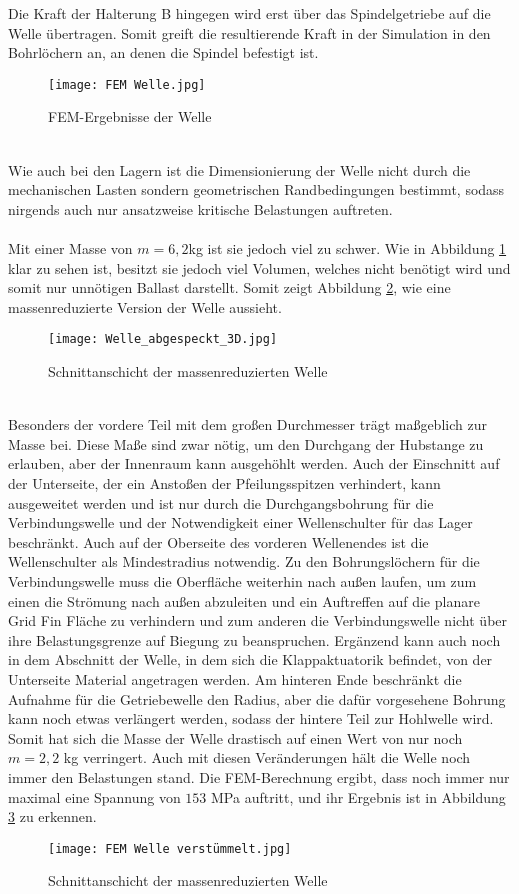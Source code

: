 Die Kraft der Halterung B hingegen wird erst über das Spindelgetriebe auf die Welle übertragen. Somit greift die resultierende Kraft in der Simulation in den Bohrlöchern an, an denen die Spindel befestigt ist.
\begin{figure}[h] 
	\centering
	\texttt{[image: FEM Welle.jpg]}
	\caption{FEM-Ergebnisse der Welle}
	\label{abb_Well_FEM}
\end{figure}\\
Wie auch bei den Lagern ist die Dimensionierung der Welle nicht durch die mechanischen Lasten sondern geometrischen Randbedingungen bestimmt, sodass nirgends auch nur ansatzweise kritische Belastungen auftreten.
\\~\\
Mit einer Masse von $m=6,2$kg ist sie jedoch viel zu schwer. Wie in Abbildung \ref{abb_Well_FEM} klar zu sehen ist, besitzt sie jedoch viel Volumen, welches nicht benötigt wird und somit nur unnötigen Ballast darstellt. Somit zeigt Abbildung \ref{abb_abgespeckt}, wie eine massenreduzierte Version der Welle aussieht.
\begin{figure}[h] 
	\centering
	\texttt{[image: Welle\_abgespeckt\_3D.jpg]}
	\caption{Schnittanschicht der massenreduzierten Welle}
	\label{abb_abgespeckt}
\end{figure}\\ Besonders der vordere Teil mit dem großen Durchmesser trägt maßgeblich zur Masse bei. Diese Maße sind zwar nötig, um den Durchgang der Hubstange zu erlauben, aber der Innenraum kann ausgehöhlt werden. Auch der Einschnitt auf der Unterseite, der ein Anstoßen der Pfeilungsspitzen verhindert, kann ausgeweitet werden und ist nur durch die Durchgangsbohrung für die Verbindungswelle und der Notwendigkeit einer Wellenschulter für das Lager beschränkt. Auch auf der Oberseite des vorderen Wellenendes ist die Wellenschulter als Mindestradius notwendig. Zu den Bohrungslöchern für die Verbindungswelle muss die Oberfläche weiterhin nach außen laufen, um zum einen die Strömung nach außen abzuleiten und ein Auftreffen auf die planare Grid Fin Fläche zu verhindern und zum anderen die Verbindungswelle nicht über ihre Belastungsgrenze auf Biegung zu beanspruchen. Ergänzend kann auch noch in dem Abschnitt der Welle, in dem sich die Klappaktuatorik befindet, von der Unterseite Material angetragen werden. Am hinteren Ende beschränkt die Aufnahme für die Getriebewelle den Radius, aber die dafür vorgesehene Bohrung kann noch etwas verlängert werden, sodass der hintere Teil zur Hohlwelle wird. Somit hat sich die Masse der Welle drastisch auf einen Wert von nur noch $m= 2,2$ kg verringert. Auch mit diesen Veränderungen hält die Welle noch immer den Belastungen stand. Die FEM-Berechnung ergibt, dass noch immer nur maximal eine Spannung von $153$ MPa auftritt, und ihr Ergebnis ist in Abbildung \ref{abb_abgespecktFEM} zu erkennen.
\begin{figure}[h] 
\centering
\texttt{[image: FEM Welle verstümmelt.jpg]}
\caption{Schnittanschicht der massenreduzierten Welle}
\label{abb_abgespecktFEM}
\end{figure}
